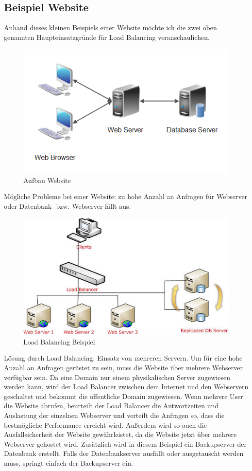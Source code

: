 \pagebreak
\subsection{Beispiel Website}
\label{sec:Beispiel Website}
Anhand dieses kleinen Beispiels einer Website möchte ich die zwei oben genannten Haupteinsatzgründe für Load Balancing veranschaulichen. 
\begin{figure}[!ht]
	\begin{center}
		\includegraphics[width=0.4\linewidth]{images/loadbalancing12.jpg}
		\caption{Aufbau Website \cite{LoadBalancingGrafik2}}
		\label{Aufbau Website}
	\end{center}
\end{figure}

Mögliche Probleme bei einer Website: zu hohe Anzahl an Anfragen für Webserver oder Datenbank- bzw. Webserver fällt aus.

\begin{figure}[!ht]
	\begin{center}
		\includegraphics[width=0.4\linewidth]{images/loadbalancing1.jpg}
		\caption{Load Balancing Beispiel \cite{LoadBalancingGrafik1}}
		\label{Load_Balancing_Beispiel}
	\end{center}
\end{figure}

Lösung durch Load Balancing: Einsatz von mehreren Servern. Um für eine hohe Anzahl an Anfragen gerüstet zu sein, muss die Website über mehrere Webserver verfügbar sein. Da eine Domain nur einem physikalischen Server zugewiesen werden kann, wird der Load Balancer zwischen dem Internet und den Webservern geschaltet und bekommt die öffentliche Domain zugewiesen. Wenn mehrere User die Website abrufen, beurteilt der Load Balancer die Antwortzeiten und Auslastung der einzelnen Webserver und verteilt die Anfragen so, dass die bestmögliche Performance erreicht wird. Außerdem wird so auch die Ausfallsicherheit der Website gewährleistet, da die Website jetzt über mehrere Webserver gehostet wird. Zusätzlich wird in diesem Beispiel ein Backupserver der Datenbank erstellt. Falls der Datenbankserver ausfällt oder ausgetauscht werden muss, springt einfach der Backupserver ein.      

